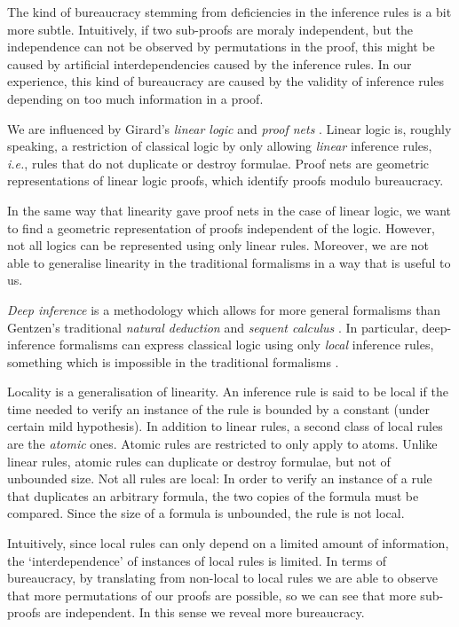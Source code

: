 The kind of bureaucracy stemming from deficiencies in the inference rules is a bit more subtle. Intuitively, if two sub-proofs are moraly independent, but the independence can not be observed by permutations in the proof, this might be caused by artificial interdependencies caused by the inference rules. In our experience, this kind of bureaucracy are caused by the validity of inference rules depending on too much information in a proof.


We are influenced by Girard's \emph{linear logic} and \emph{proof nets} \cite{Gira:87:Linear-L:wm}. Linear logic is, roughly speaking, a restriction of classical logic by only allowing \emph{linear} inference rules, \emph{i.e.}, rules that do not duplicate or destroy formulae. Proof nets are geometric representations of linear logic proofs, which identify proofs modulo bureaucracy.

In the same way that linearity gave proof nets in the case of linear logic, we want to find a geometric representation of proofs independent of the logic. However, not all logics can be represented using only linear rules. Moreover, we are not able to generalise linearity in the traditional formalisms in a way that is useful to us.

\emph{Deep inference} \cite{Gugl:06:A-System:kl} is a methodology which allows for more general formalisms than Gentzen's traditional \emph{natural deduction} and \emph{sequent calculus} \cite{Gent:69:Investig:xi}. In particular, deep-inference formalisms can express classical logic using only \emph{local} \cite{BrunTiu:01:A-Local-:mz} inference rules, something which is impossible in the traditional formalisms \cite{Brun:03:Two-Rest:mn}.

Locality is a generalisation of linearity. An inference rule is said to be local if the time needed to verify an instance of the rule is bounded by a constant (under certain mild hypothesis). In addition to linear rules, a second class of local rules are the \emph{atomic} ones. Atomic rules are restricted to only apply to atoms. Unlike linear rules, atomic rules can duplicate or destroy formulae, but not of unbounded size. Not all rules are local: In order to verify an instance of a rule that duplicates an arbitrary formula, the two copies of the formula must be compared. Since the size of a formula is unbounded, the rule is not local.

Intuitively, since local rules can only depend on a limited amount of information, the `interdependence' of instances of local rules is limited. In terms of bureaucracy, by translating from non-local to local rules we are able to observe that more permutations of our proofs are possible, so we can see that more sub-proofs are independent. In this sense we reveal more bureaucracy.

